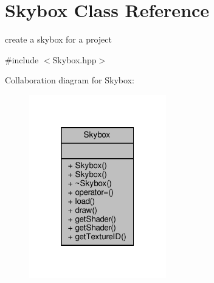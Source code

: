 \hypertarget{class_skybox}{}\section{Skybox Class Reference}
\label{class_skybox}


create a skybox for a project  




{\ttfamily \#include $<$Skybox.\+hpp$>$}



Collaboration diagram for Skybox\+:
\nopagebreak
\begin{figure}[H]
\begin{center}
\leavevmode
\includegraphics[width=169pt]{class_skybox__coll__graph}
\end{center}
\end{figure}
